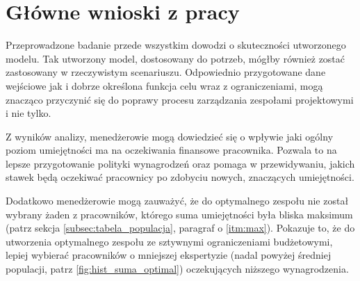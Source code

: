 \section*{Główne wnioski z pracy}
\par Przeprowadzone badanie przede wszystkim dowodzi o skuteczności utworzonego modelu. Tak utworzony model, dostosowany do potrzeb, mógłby również zostać zastosowany w rzeczywistym scenariuszu. Odpowiednio przygotowane dane wejściowe jak i dobrze określona funkcja celu wraz z ograniczeniami, mogą znacząco przyczynić się do poprawy procesu zarządzania zespołami projektowymi i nie tylko. 

\par Z wyników analizy, menedżerowie mogą dowiedzieć się o wpływie jaki ogólny poziom umiejętności ma na oczekiwania finansowe pracownika. Pozwala to na lepsze przygotowanie polityki wynagrodzeń oraz pomaga w przewidywaniu, jakich stawek będą oczekiwać pracownicy po zdobyciu nowych, znaczących umiejętności.

\par Dodatkowo menedżerowie mogą zauważyć, że do optymalnego zespołu nie został wybrany żaden z pracowników, którego suma umiejętności była bliska maksimum (patrz sekcja \ref{subsec:tabela_populacja}, paragraf o \ref{itm:max}). Pokazuje to, że do utworzenia optymalnego zespołu ze sztywnymi ograniczeniami budżetowymi, lepiej wybierać pracowników o mniejszej ekspertyzie (nadal powyżej średniej populacji, patrz \ref{fig:hist_suma_optimal}) oczekujących niższego wynagrodzenia.
